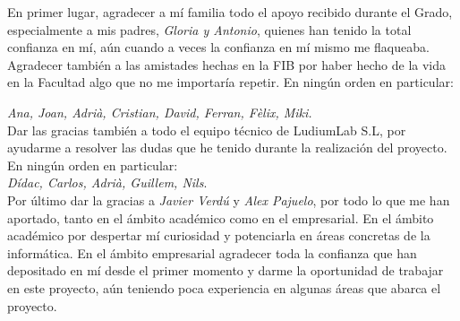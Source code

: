 
En primer lugar, agradecer a mí familia todo el apoyo recibido durante el Grado, especialmente a mis padres, \textit{Gloria y Antonio}, quienes han tenido la total confianza en mí, aún cuando a veces la confianza en mí mismo me flaqueaba. \\

Agradecer también a las amistades hechas en la FIB por haber hecho de la vida en la Facultad algo que no me importaría repetir. En ningún orden en particular:

\textit{Ana, Joan, Adrià, Cristian, David, Ferran, Fèlix, Miki.}\\

Dar las gracias también a todo el equipo técnico de LudiumLab S.L, por ayudarme a resolver las dudas que he tenido durante la realización del proyecto. En ningún orden en particular: \\
\textit{Dídac, Carlos, Adrià, Guillem, Nils}. \\

Por último dar la gracias a \textit{Javier Verdú} y \textit{Alex Pajuelo}, por todo lo que me han aportado, tanto en el ámbito académico como en el empresarial. En el ámbito académico por despertar mí curiosidad y potenciarla en áreas concretas de la informática. En el ámbito empresarial agradecer toda la confianza que han depositado en mí desde el primer momento y darme la oportunidad de trabajar en este proyecto, aún teniendo poca experiencia en algunas áreas que abarca el proyecto.


  


